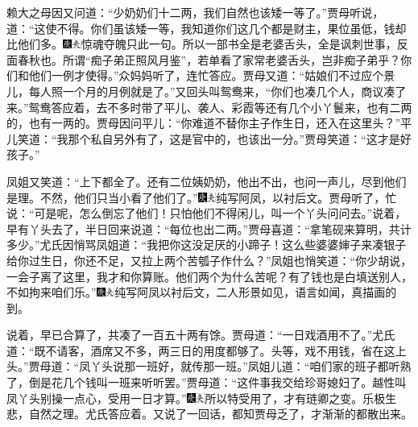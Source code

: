 赖大之母因又问道：“少奶奶们十二两，我们自然也该矮一等了。”贾母听说，道：“这使不得。你们虽该矮一等，我知道你们这几个都是财主，果位虽低，钱却比他们多。{\includegraphics[width=3mm]{../Images/00004}\includegraphics[width=3mm]{../Images/00012}\footnotesize \kaishu 惊魂夺魄只此一句。所以一部书全是老婆舌头，全是讽刺世事，反面春秋也。所谓“痴子弟正照风月鉴”，若单看了家常老婆舌头，岂非痴子弟乎？}你们和他们一例才使得。”众妈妈听了，连忙答应。贾母又道：“姑娘们不过应个景儿，每人照一个月的月例就是了。”又回头叫鸳鸯来，“你们也凑几个人，商议凑了来。”鸳鸯答应着，去不多时带了平儿、袭人、彩霞等还有几个小丫鬟来，也有二两的，也有一两的。贾母因问平儿：“你难道不替你主子作生日，还入在这里头？”平儿笑道：“我那个私自另外有了，这是官中的，也该出一分。”贾母笑道：“这才是好孩子。”

凤姐又笑道：“上下都全了。还有二位姨奶奶，他出不出，也问一声儿，尽到他们是理。不然，他们只当小看了他们了。”{\includegraphics[width=3mm]{../Images/00004}\includegraphics[width=3mm]{../Images/00012}\footnotesize \kaishu 纯写阿凤，以衬后文。}贾母听了，忙说：“可是呢，怎么倒忘了他们！只怕他们不得闲儿，叫一个丫头问问去。”说着，早有丫头去了，半日回来说道：“每位也出二两。”贾母喜道：“拿笔砚来算明，共计多少。”尤氏因悄骂凤姐道：“我把你这没足厌的小蹄子！这么些婆婆婶子来凑银子给你过生日，你还不足，又拉上两个苦瓠子作什么？”凤姐也悄笑道：“你少胡说，一会子离了这里，我才和你算账。他们两个为什么苦呢？有了钱也是白填送别人，不如拘来咱们乐。”{\includegraphics[width=3mm]{../Images/00004}\includegraphics[width=3mm]{../Images/00012}\footnotesize \kaishu 纯写阿凤以衬后文，二人形景如见，语言如闻，真描画的到。}

说着，早已合算了，共凑了一百五十两有馀。贾母道：“一日戏酒用不了。”尤氏道：“既不请客，酒席又不多，两三日的用度都够了。头等，戏不用钱，省在这上头。”贾母道：“凤丫头说那一班好，就传那一班。”凤姐儿道：“咱们家的班子都听熟了，倒是花几个钱叫一班来听听罢。”贾母道：“这件事我交给珍哥媳妇了。越性叫凤丫头别操一点心，受用一日才算。”{\includegraphics[width=3mm]{../Images/00004}\includegraphics[width=3mm]{../Images/00012}\footnotesize \kaishu 所以特受用了，才有琏卿之变。乐极生悲，自然之理。}尤氏答应着。又说了一回话，都知贾母乏了，才渐渐的都散出来。

